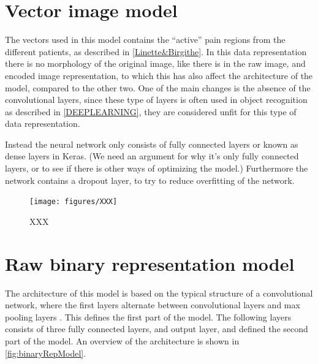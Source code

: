 \section{Vector image model}
The vectors used in this model contains the “active” pain regions from the different patients, as described in \autoref{Linette&Birgithe}. In this data representation there is no morphology of the original image, like there is in the raw image, and encoded image representation, to which this has also affect the architecture of the model, compared to the other two.
One of the main changes is the absence of the convolutional layers, since these type of layers is often used in object recognition as described in \autoref{DEEPLEARNING}, they are considered unfit for this type of data representation.    

Instead the neural network only consists of fully connected layers or known as dense layers in Keras. (We need an argument for why it’s only fully connected layers, or to see if there is other ways of optimizing the model.)
Furthermore the network contains a dropout layer, to try to reduce overfitting of the network. 

\begin{figure} [H]
\centering
\texttt{[image: figures/XXX]}
\caption{XXX}
\label{fig:XXX}  
\end{figure}



\section{Raw binary representation model}\label{sec:binaryRepModel}
The architecture of this model is based on the typical structure of a convolutional network, where the first layers alternate between convolutional layers and max pooling layers \citep{LeCun2015}. This defines the first part of the model. The following layers consists of three fully connected layers, and output layer, and defined the second part of the model. An overview of the architecture is shown in \autoref{fig:binaryRepModel}.    


